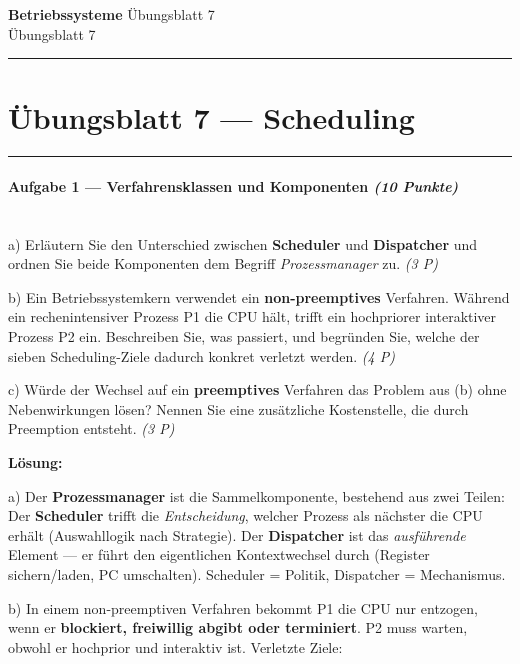 \documentclass[11pt, a4paper]{article}
\providecommand{\nichttitle}{Übungsblatt}
\providecommand{\nichtsubtitle}{}
\renewcommand{\nichttitle}{Betriebssysteme}
\renewcommand{\nichtsubtitle}{Übungsblatt 7}
\begin{document}
\begin{center}
{\Large\bfseries\color{accent}\nichttitle}
\ifx\nichtsubtitle\empty\else
  \\[2pt]{\normalsize\color{accent!80!black}\nichtsubtitle}
\fi
\\[2pt]
\color{accent}\rule{0.4\linewidth}{0.8pt}\color{black}
\end{center}
\vspace{4pt}


\section{Übungsblatt 7 — Scheduling}


\noindent\textcolor{rulegray}{\rule{\linewidth}{0.4pt}}


\paragraph{Aufgabe 1 — Verfahrensklassen und Komponenten \textit{(10 Punkte)}}\mbox{}\\[2pt]

a) Erläutern Sie den Unterschied zwischen \textbf{Scheduler} und \textbf{Dispatcher} und ordnen Sie beide Komponenten dem Begriff \textit{Prozessmanager} zu. \textit{(3 P)}


b) Ein Betriebssystemkern verwendet ein \textbf{non-preemptives} Verfahren. Während ein rechenintensiver Prozess P1 die CPU hält, trifft ein hochpriorer interaktiver Prozess P2 ein. Beschreiben Sie, was passiert, und begründen Sie, welche der sieben Scheduling-Ziele dadurch konkret verletzt werden. \textit{(4 P)}


c) Würde der Wechsel auf ein \textbf{preemptives} Verfahren das Problem aus (b) ohne Nebenwirkungen lösen? Nennen Sie eine zusätzliche Kostenstelle, die durch Preemption entsteht. \textit{(3 P)}


\textbf{Lösung:}


a) Der \textbf{Prozessmanager} ist die Sammelkomponente, bestehend aus zwei Teilen: Der \textbf{Scheduler} trifft die \textit{Entscheidung}, welcher Prozess als nächster die CPU erhält (Auswahllogik nach Strategie). Der \textbf{Dispatcher} ist das \textit{ausführende} Element — er führt den eigentlichen Kontextwechsel durch (Register sichern/laden, PC umschalten). Scheduler = Politik, Dispatcher = Mechanismus.


b) In einem non-preemptiven Verfahren bekommt P1 die CPU nur entzogen, wenn er \textbf{blockiert, freiwillig abgibt oder terminiert}. P2 muss warten, obwohl er hochprior und interaktiv ist. Verletzte Ziele:
\end{document}
